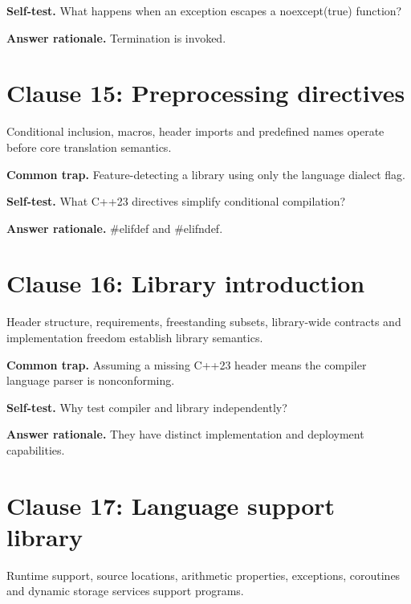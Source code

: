 \documentclass[11pt]{article}
\begin{document}
\textbf{Self-test.} What happens when an exception escapes a noexcept(true) function?

\textbf{Answer rationale.} Termination is invoked.

\section{Clause 15: Preprocessing directives}
Conditional inclusion, macros, header imports and predefined names operate before core translation semantics.

\textbf{Common trap.} Feature-detecting a library using only the language dialect flag.

\textbf{Self-test.} What C++23 directives simplify conditional compilation?

\textbf{Answer rationale.} \#elifdef and \#elifndef.

\section{Clause 16: Library introduction}
Header structure, requirements, freestanding subsets, library-wide contracts and implementation freedom establish library semantics.

\textbf{Common trap.} Assuming a missing C++23 header means the compiler language parser is nonconforming.

\textbf{Self-test.} Why test compiler and library independently?

\textbf{Answer rationale.} They have distinct implementation and deployment capabilities.

\section{Clause 17: Language support library}
Runtime support, source locations, arithmetic properties, exceptions, coroutines and dynamic storage services support programs.
\end{document}
